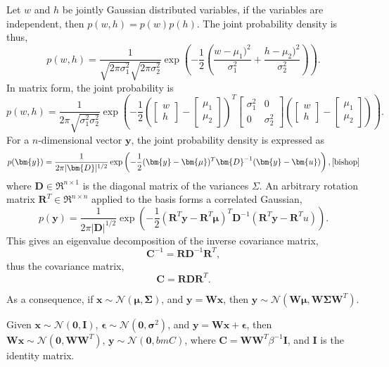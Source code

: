 \documentclass[ %
author={Dillon Keith Diep [INCOMPLETE DRAFT, NOT FOR SUBMISSION]},
supervisor={Dr. Carl Henrik Ek},
degree={MEng},
title={ARt-CG:},
subtitle={Assisted Real-time Content Generation of 3D Hair by Learning Manifolds},
type={Research},
year={2014} ]{dissertation}
\begin{document}
\noindent
Let $w$ and $h$ be jointly Gaussian distributed variables, if the variables are independent, then $p(w,h)=p(w)p(h)$.
The joint probability density is thus,
$$p(w,h)=\frac{1}{\sqrt{2\pi\sigma^2_1}\sqrt{2\pi\sigma^2_2}}\exp\left(-\frac{1}{2}\left(\frac{w-\mu_1)^2}{\sigma^2_1}+\frac{h-\mu_2)^2}{\sigma^2_2}\right)\right).$$
In matrix form, the joint probability is
$$p(w,h)=\frac{1}{2\pi\sqrt{\sigma^2_1\sigma^2_2}}\exp
\left(
-\frac{1}{2}
\left(
\left[
\begin{matrix}
w \\
h
\end{matrix}
\right]
-
\left[
\begin{matrix}
\mu_1 \\
\mu_2
\end{matrix}
\right]
\right)^T
\left[
\begin{matrix}
\sigma^2_1  &   0\\
0           &   \sigma^2_2
\end{matrix}
\right]
\left(
\left[
\begin{matrix}
w \\
h
\end{matrix}
\right]
-
\left[
\begin{matrix}
\mu_1 \\
\mu_2
\end{matrix}
\right]
\right)
\right).$$
For a $n$-dimensional vector $\bm{y}$, the joint probability density is expressed as
$$p(\bm{y})=\frac{1}{2\pi|\bm{D}|^{1/2}}\exp\left(-\frac{1}{2}(\bm{y}-\bm{\mu})^T\bm{D}^{-1}(\bm{y}-\bm{u})\right), \cite[p.78]{bishop}$$
where $\bm{D}\in\Re^{n \times 1}$ is the diagonal matrix of the variances $\Sigma$.
An arbitrary rotation matrix $\bm{R}^T\in\Re^{n \times n}$ applied to the basis forms a correlated Gaussian,
$$p(\bm{y})=\frac{1}{2\pi|\bm{D}|^{1/2}}\exp\left(-\frac{1}{2}(\bm{R}^T\bm{y}-\bm{R}^T\bm{\mu})^T\bm{D}^{-1}(\bm{R}^T\bm{y}-\bm{R}^T{u})\right).$$
This gives an eigenvalue decomposition of the inverse covariance matrix, 
$$\bm{C}^{-1}=\bm{RD}^{-1}\bm{R}^T,$$
thus the covariance matrix, 
$$\bm{C}=\bm{RDR}^T.$$

{\color{red}
As a consequence, if $\bm{x}\sim\mathcal{N}(\bm{\mu},\bm{\Sigma})$, and $\bm{y}=\bm{Wx}$, then $\bm{y}\sim\mathcal{N}(\bm{W\mu},\bm{W \Sigma W}^T)$.

Given
$\bm{x}\sim\mathcal{N}(\bm{0},\bm{I})$,
$\bm{\epsilon}\sim\mathcal{N}(\bm{0},\bm{\sigma}^2)$, and
$\bm{y}=\bm{Wx}+\bm{\epsilon}$, then
$\bm{Wx}\sim\mathcal{N}(\bm{0},\bm{WW}^T)$,
$\bm{y}\sim\mathcal{N}(\bm{0},bm{C})$, where $\bm{C}=\bm{WW}^T\beta^{-1}\bm{I}$, and $\bm{I}$ is the identity matrix. \cite{gplvm}




}
\end{document}
